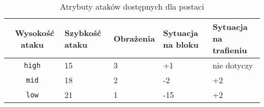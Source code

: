 \begin{table}[htb] \small
\centering
\caption{Atrybuty ataków dostępnych dla postaci}
\label{tab:ataki}
\begin{tabularx}{\linewidth}{|c|X|X|X|X|} \hline\
Wysokość ataku & Szybkość ataku & Obrażenia & Sytuacja na bloku & Sytuacja na trafieniu \\ \hline\hline
\texttt{high} & 15 & 3 & +1 & nie dotyczy \\ \hline
\texttt{mid} & 18 & 2 & -2 & +2\\ \hline
\texttt{low} & 21 & 1 & -15 & +2\\ \hline
\end{tabularx}
\end{table}